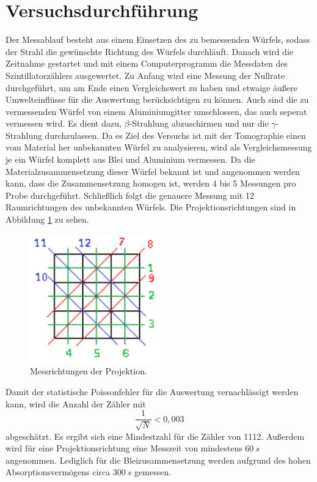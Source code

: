 \section{Versuchsdurchführung}
Der Messablauf besteht aus einem Einsetzen des zu bemessenden Würfels, sodass der Strahl die gewünschte Richtung des Würfels durchläuft.
Danach wird die Zeitnahme gestartet und mit einem Computerprogramm die Messdaten des Szintillatorzählers ausgewertet.
Zu Anfang wird eine Messung der Nullrate durchgeführt, um am Ende einen Vergleichswert zu haben und etwaige äußere Umwelteinflüsse für die Auswertung berücksichtigen zu können.
Auch sind die zu vermessenden Würfel von einem Aluminiumgitter umschlossen, das auch seperat vermessen wird.
Es dient dazu, $\beta$-Strahlung abzuschirmen und nur die $\gamma$-Strahlung durchzulassen.
Da es Ziel des Versuchs ist mit der Tomographie einen vom Material her unbekannten Würfel zu analysieren, wird
als Vergleichsmessung je ein Würfel komplett aus Blei und Aluminium vermessen.
Da die Materialzusammensetzung dieser Würfel bekannt ist und angenommen werden kann, dass die Zusammensetzung homogen ist, werden 4 bis 5 Messungen pro Probe durchgeführt.
Schließlich folgt die genauere Messung mit 12 Raumrichtungen des unbekannten Würfels.
Die Projektionsrichtungen sind in Abbildung \ref{fig:richtung} zu sehen.
\begin{figure}[H]
  \centering
  \includegraphics[width=0.5\textwidth]{Bilder/richtung.png}
  \caption{Messrichtungen der Projektion.}
  \label{fig:richtung}
\end{figure}
Damit der statistische Poissonfehler für die Auswertung vernachlässigt werden kann,
wird die Anzahl der Zähler mit
\begin{equation}
  \frac{1}{\sqrt{N}}<0,003
\end{equation}
abgeschätzt.
Es ergibt sich eine Mindestzahl für die Zähler von 1112. Außerdem wird für eine Projektionsrichtung eine Messzeit von mindestens $\SI{60}{s}$ angenommen.
Lediglich für die Bleizusammensetzung werden aufgrund des hohen Absorptionsvermögens circa $\SI{300}{s}$ gemessen.
